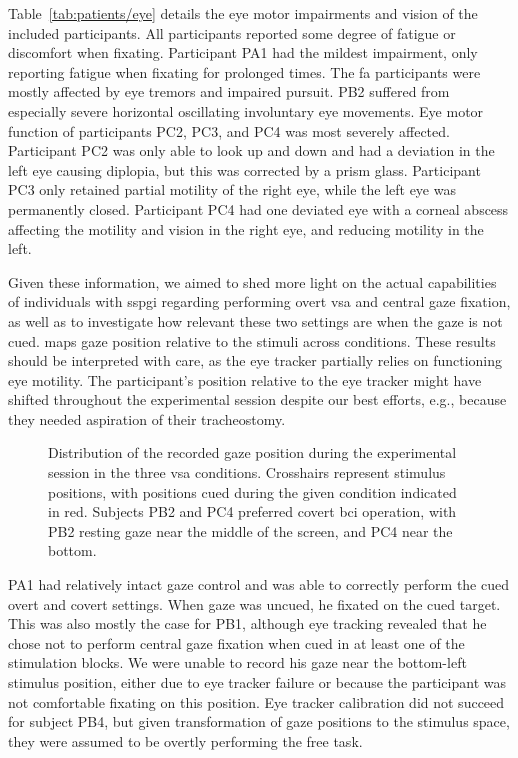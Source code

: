 \documentclass[twocolumn]{article}
\begin{document}
Table~\ref{tab:patients/eye} details the eye motor impairments and vision of
the included participants.
All participants reported some degree of fatigue or discomfort when fixating.
Participant PA1 had the mildest impairment, only reporting fatigue when fixating
for prolonged times.
The \ac{fa} participants were mostly affected by eye tremors and impaired pursuit.
PB2 suffered from especially severe horizontal oscillating involuntary eye
movements.
Eye motor function of participants PC2, PC3, and PC4 was most severely affected.
Participant PC2 was only able to look up and down and had a deviation in the
left eye causing diplopia, but this was corrected by a prism glass.
Participant PC3 only retained partial motility of the right eye, while the left eye was permanently closed.
Participant PC4 had one deviated eye with a corneal abscess affecting the motility
and vision in the right eye, and reducing motility in the left.


Given these information, we aimed to shed more light on the actual capabilities of individuals
with \ac{sspgi} regarding performing overt \ac{vsa} and central gaze
fixation, as well as to investigate how relevant these two settings are when the
gaze is not cued.
 maps gaze position relative to the stimuli
across conditions.
These results should be interpreted with care, as the eye tracker partially
relies on functioning eye motility.
The participant's position relative to the eye tracker might have shifted
throughout the experimental session despite our best efforts, e.g., because they
needed aspiration of their tracheostomy.
\begin{figure}[t]
  \caption{%
    Distribution of the recorded gaze position during the experimental session in the three \ac{vsa}
    conditions.
    Crosshairs represent stimulus positions, with positions cued during
    the given condition indicated in red.
    Subjects PB2 and PC4 preferred covert \ac{bci} operation, with PB2 resting gaze
    near the middle of the screen, and PC4 near the bottom.
  }%
  \label{fig:patients/gaze}
\end{figure}

PA1 had relatively intact gaze control and was able to correctly perform the
cued overt and covert settings.
When gaze was uncued, he fixated on the cued target.
This was also mostly the case for PB1, although eye tracking revealed that he
chose not to perform central gaze fixation when cued in at least one of the
stimulation blocks. We were unable to record his gaze near the bottom-left
stimulus position, either due to eye tracker failure or because the participant
was not comfortable fixating on this position.
Eye tracker calibration did not succeed for subject PB4, but given
transformation of gaze positions to the stimulus space, they were assumed to
be overtly performing the free task.
\end{document}
